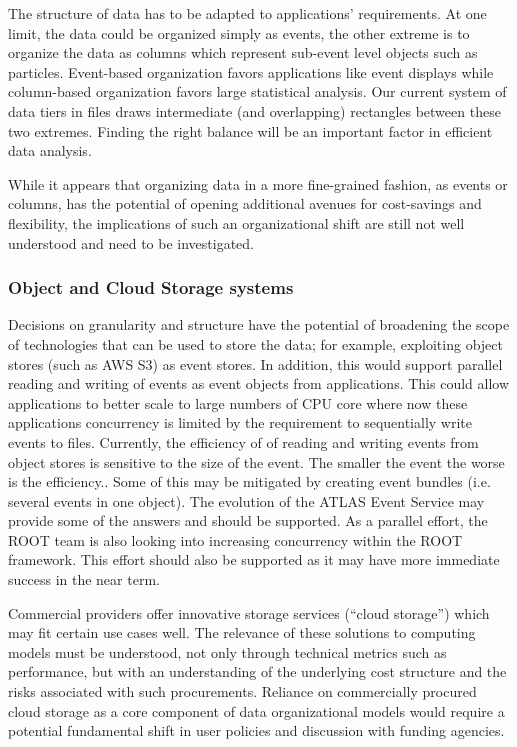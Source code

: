 \documentclass[12pt,a4paper]{article}
\begin{document}
The structure of data has to be adapted to applications' requirements.
At one limit, the data could be organized simply as events, the other
extreme is to organize the data as columns which represent sub-event
level objects such as particles. Event-based organization favors
applications like event displays while column-based organization favors
large statistical analysis. Our current system of data tiers in files
draws intermediate (and overlapping) rectangles between these two
extremes. Finding the right balance will be an important factor in
efficient data analysis.

While it appears that organizing data in a more fine-grained fashion, as
events or columns, has the potential of opening additional avenues for
cost-savings and flexibility, the implications of such an organizational
shift are still not well understood and need to be investigated.

\subsubsection{Object and Cloud Storage
systems}\label{object-and-cloud-storage-systems}

Decisions on granularity and structure have the potential of broadening
the scope of technologies that can be used to store the data; for
example, exploiting object stores (such as AWS S3) as event stores. In
addition, this would support parallel reading and writing of events as
event objects from applications. This could allow applications to better
scale to large numbers of CPU core where now these applications
concurrency is limited by the requirement to sequentially write events
to files. Currently, the efficiency of of reading and writing events
from object stores is sensitive to the size of the event. The smaller
the event the worse is the efficiency.. Some of this may be mitigated by
creating event bundles (i.e. several events in one object). The
evolution of the ATLAS Event Service may provide some of the answers and
should be supported. As a parallel effort, the ROOT team is also looking
into increasing concurrency within the ROOT framework. This effort
should also be supported as it may have more immediate success in the
near term.

Commercial providers offer innovative storage services (``cloud
storage'') which may fit certain use cases well. The relevance of these
solutions to computing models must be understood, not only through
technical metrics such as performance, but with an understanding of the
underlying cost structure and the risks associated with such
procurements. Reliance on commercially procured cloud storage as a core
component of data organizational models would require a potential
fundamental shift in user policies and discussion with funding agencies.
\end{document}
